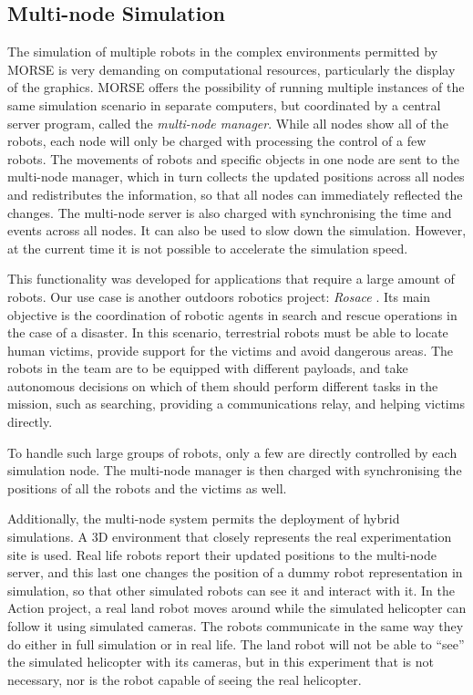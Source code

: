\documentclass{llncs}
\begin{document}
\subsection{Multi-node Simulation}
\label{section:multinode}

The simulation of multiple robots in the complex environments permitted by
MORSE is very demanding on computational resources, particularly the
display of the graphics. MORSE offers the possibility of running multiple
instances of the same simulation scenario in separate computers, but
coordinated by a central server program, called the \emph{multi-node
manager}. While all nodes show all of the robots, each node will only
be charged with processing the control of a few robots. The movements
of robots and specific objects in one node are sent to the multi-node
manager, which in turn collects the updated positions across all nodes
and redistributes the information, so that all nodes can immediately
reflected the changes.  The multi-node server is also charged with
synchronising the time and events across all nodes. It can also be used
to slow down the simulation. However, at the current time it is not
possible to accelerate the simulation speed.

This functionality was developed for applications that require a large amount
of robots. Our use case is another outdoors robotics project: \emph{Rosace}
\cite{springerlink:10.1007/978-3-642-12384-9_18,springerlink:10.1007/978-3-642-28786-2_32}.
Its main objective is the coordination of robotic agents in search and rescue
operations in the case of a disaster. In this scenario, terrestrial robots must
be able to locate human victims, provide support for the victims and avoid
dangerous areas. The robots in the team are to be equipped with different
payloads, and take autonomous decisions on which of them should perform
different tasks in the mission, such as searching, providing a communications
relay, and helping victims directly.

To handle such large groups of robots, only a few are directly controlled by
each simulation node. The multi-node manager is then charged with synchronising
the positions of all the robots and the victims as well.

Additionally, the multi-node system permits the deployment of hybrid
simulations. A 3D environment that closely represents the real experimentation
site is used. Real life robots report their updated positions to the multi-node
server, and this last one changes the position of a dummy robot representation
in simulation, so that other simulated robots can see it and interact with it.
In the Action project, a real land robot moves around while the simulated
helicopter can follow it using simulated cameras.
The robots communicate in the same way they do either in full simulation or in
real life.  The land robot will not be able to ``see'' the simulated helicopter
with its cameras, but in this experiment that is not necessary, nor is the
robot capable of seeing the real helicopter.
\end{document}
